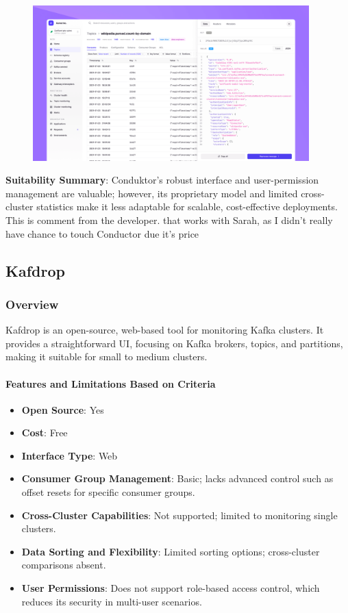 \documentclass[10pt , a4paper]{report}
\begin{document}
\begin{figure}[htbp]
  \begin{center}
    \includegraphics[width=0.95\textwidth]{imgs/Conduktor.png}
  \end{center}
  \caption{}\label{fig:}
\end{figure}


\textbf{Suitability Summary}: Conduktor’s robust interface and user-permission management are valuable; however, its proprietary model and limited cross-cluster statistics make it less adaptable for scalable, cost-effective deployments. This is comment from the developer. that works with Sarah, as I didn't really have chance to touch Conductor due it's price

\subsection{Kafdrop} 
\subsubsection*{Overview} 
Kafdrop is an open-source, web-based tool for monitoring Kafka clusters. It provides a straightforward UI, focusing on Kafka brokers, topics, and partitions, making it suitable for small to medium clusters.

\paragraph{Features and Limitations Based on Criteria}
\begin{itemize} 
    \item \small \textbf{Open Source}: Yes
    \item \small \textbf{Cost}: Free
    \item \small \textbf{Interface Type}: Web
    \item \small \textbf{Consumer Group Management}: Basic; lacks advanced control such as offset resets for specific consumer groups.
    \item \small \textbf{Cross-Cluster Capabilities}: Not supported; limited to monitoring single clusters.
    \item \small \textbf{Data Sorting and Flexibility}: Limited sorting options; cross-cluster comparisons absent.
    \item \small \textbf{User Permissions}: Does not support role-based access control, which reduces its security in multi-user scenarios.
\end{itemize}
\end{document}
